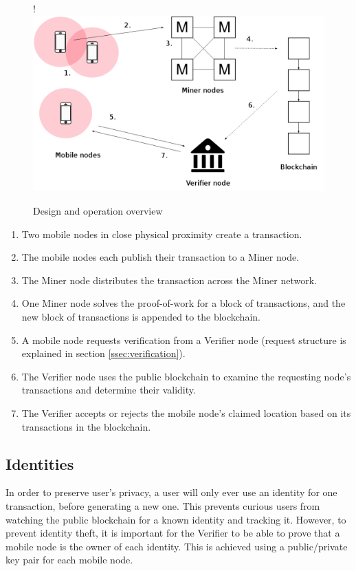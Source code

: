 \begin{figure}[H]
\begin{center}
\resizebox {\columnwidth} {!} {\includegraphics{diagrams/overview.png}}
\caption{Design and operation overview}
\label{fig:overview}
\end{center}
\end{figure}

\begin{enumerate}[label=\textbf{\arabic*}.]
\item Two mobile nodes in close physical proximity create a transaction.
\item The mobile nodes each publish their transaction to a Miner node.
\item The Miner node distributes the transaction across the Miner network.
\item One Miner node solves the proof-of-work for a block of transactions, and the new block of transactions is appended to the blockchain.
\item A mobile node requests verification from a Verifier node (request structure is explained in section \ref{ssec:verification}).
\item The Verifier node uses the public blockchain to examine the requesting node's transactions and determine their validity.
\item The Verifier accepts or rejects the  mobile node's claimed location based on its transactions in the blockchain. 
\end{enumerate}

\subsection{Identities}
In order to preserve user's privacy, a user will only ever use an identity for one transaction, before generating a new one. This prevents curious users from watching the public blockchain for a known identity and tracking it. However, to prevent identity theft, it is important for the Verifier to be able to prove that a mobile node is the owner of each identity. This is achieved using a public/private key pair for each mobile node.

